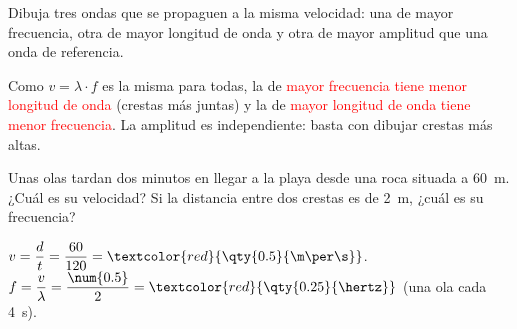 \begin{exercise}
    Dibuja tres ondas que se propaguen a la misma velocidad: una de mayor frecuencia, otra de mayor longitud de onda y otra de mayor amplitud que una onda de referencia.
    \begin{solu}
        Como \(v = \lambda \cdot f\) es la misma para todas, la de \textcolor{red}{mayor frecuencia tiene menor longitud de onda} (crestas más juntas) y la de \textcolor{red}{mayor longitud de onda tiene menor frecuencia}. La amplitud es independiente: basta con dibujar crestas más altas.
        \begin{center}
        \end{center}
    \end{solu}
\end{exercise}

\begin{exercise}
    Unas olas tardan dos minutos en llegar a la playa desde una roca situada a \qty{60}{\m}. ¿Cuál es su velocidad? Si la distancia entre dos crestas es de \qty{2}{\m}, ¿cuál es su frecuencia?
    \begin{solu}
        \(v = \dfrac{d}{t} = \dfrac{60}{120} = \textcolor{red}{\qty{0.5}{\m\per\s}}\). \(f = \dfrac{v}{\lambda} = \dfrac{\num{0.5}}{2} = \textcolor{red}{\qty{0.25}{\hertz}}\) (una ola cada \qty{4}{\s}).
    \end{solu}
\end{exercise}


